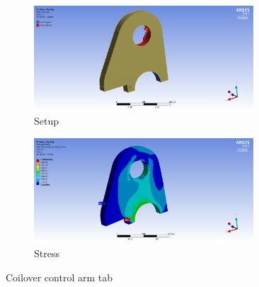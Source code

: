 \documentclass[10pt]{article}
\begin{document}
\begin{figure}[H]
\centering
\begin{subfigure}[b]{.48\textwidth}
\centering
\includegraphics[width=0.9\textwidth]{figures/fea/parts/MS00036-CoiloverControlArmTab-Setup}
\caption{Setup}
\end{subfigure}
\begin{subfigure}[b]{.48\textwidth}
\centering
\includegraphics[width=0.9\textwidth]{figures/fea/parts/MS00036-CoiloverControlArmTab-Stress}
\caption{Stress}
\end{subfigure}
\caption{Coilover control arm tab}
\label{fig:MS00036-CoiloverControlArmTab}
\end{figure}
\end{document}
